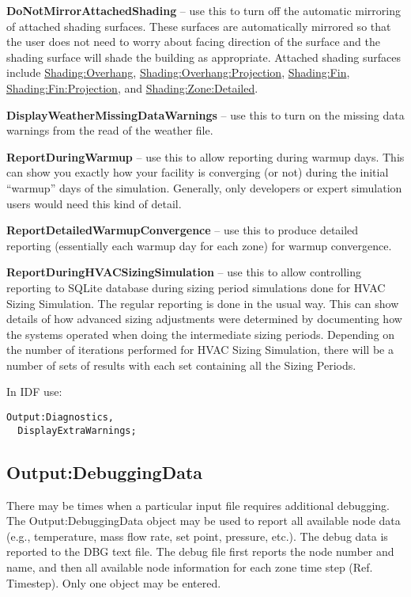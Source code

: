 \textbf{DoNotMirrorAttachedShading} -- use this to turn off the automatic mirroring of attached shading surfaces. These surfaces are automatically mirrored so that the user does not need to worry about facing direction of the surface and the shading surface will shade the building as appropriate. Attached shading surfaces include \hyperref[shadingoverhang]{Shading:Overhang}, \hyperref[shadingoverhangprojection]{Shading:Overhang:Projection}, \hyperref[shadingfin]{Shading:Fin}, \hyperref[shadingfinprojection]{Shading:Fin:Projection}, and \hyperref[shadingzonedetailed-000]{Shading:Zone:Detailed}.

\textbf{DisplayWeatherMissingDataWarnings} -- use this to turn on the missing data warnings from the read of the weather file.

\textbf{ReportDuringWarmup} -- use this to allow reporting during warmup days. This can show you exactly how your facility is converging (or not) during the initial ``warmup'' days of the simulation. Generally, only developers or expert simulation users would need this kind of detail.

\textbf{ReportDetailedWarmupConvergence} -- use this to produce detailed reporting (essentially each warmup day for each zone) for warmup convergence.

\textbf{ReportDuringHVACSizingSimulation} -- use this to allow controlling reporting to SQLite database during sizing period simulations done for HVAC Sizing Simulation. The regular reporting is done in the usual way. This can show details of how advanced sizing adjustments were determined by documenting how the systems operated when doing the intermediate sizing periods. Depending on the number of iterations performed for HVAC Sizing Simulation, there will be a number of sets of results with each set containing all the Sizing Periods.

In IDF use:

\begin{lstlisting}
Output:Diagnostics,
  DisplayExtraWarnings;
\end{lstlisting}

\subsection{Output:DebuggingData}\label{outputdebuggingdata}

There may be times when a particular input file requires additional debugging. The Output:DebuggingData object may be used to report all available node data (e.g., temperature, mass flow rate, set point, pressure, etc.). The debug data is reported to the DBG text file. The debug file first reports the node number and name, and then all available node information for each zone time step (Ref. Timestep). Only one object may be entered.

